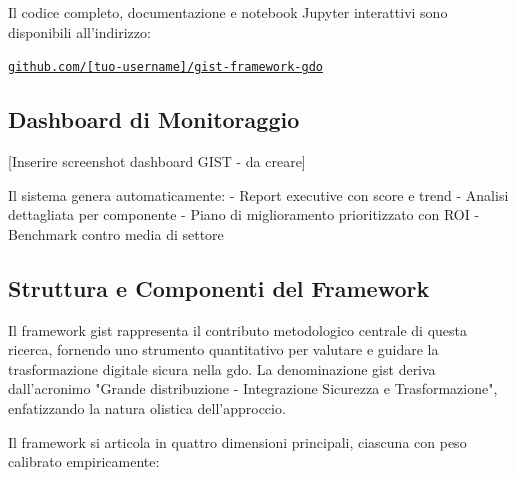 Il codice completo, documentazione e notebook Jupyter interattivi 
sono disponibili all'indirizzo:

\begin{center}
\large
\href{https://github.com/[tuo-username]/gist-framework-gdo}{\texttt{github.com/[tuo-username]/gist-framework-gdo}}
\end{center}


\subsection{\texorpdfstring{Dashboard di Monitoraggio}{5.3.4 - Dashboard di Monitoraggio}}

[Inserire screenshot dashboard GIST - da creare]

Il sistema genera automaticamente:
- Report executive con score e trend
- Analisi dettagliata per componente
- Piano di miglioramento prioritizzato con ROI
- Benchmark contro media di settore

\subsection{\texorpdfstring{Struttura e Componenti del Framework}{5.3.1 - Struttura e Componenti del Framework}}
\label{subsec:5.3.1}

Il framework \gls{gist} rappresenta il contributo metodologico centrale di questa ricerca, fornendo uno strumento quantitativo per valutare e guidare la trasformazione digitale sicura nella \gls{gdo}. La denominazione \gls{gist} deriva dall'acronimo "Grande distribuzione - Integrazione Sicurezza e Trasformazione", enfatizzando la natura olistica dell'approccio.

Il framework si articola in quattro dimensioni principali, ciascuna con peso calibrato empiricamente:

